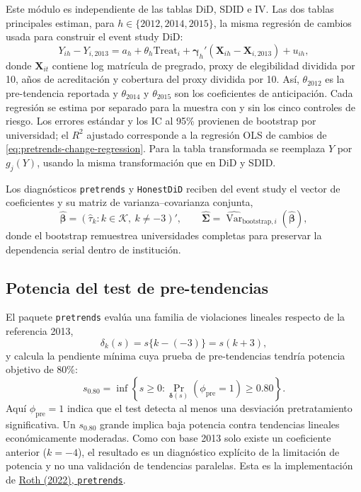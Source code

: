 \documentclass[11pt]{article}
\newcommand{\Treat}{\mathrm{Treat}}
\newcommand{\Var}{\operatorname{Var}}
\newcommand{\file}[1]{\texttt{#1}}
\begin{document}
Este módulo es independiente de las tablas DiD, SDID e IV. Las dos tablas
principales estiman, para $h\in\{2012,2014,2015\}$, la misma regresión de
cambios usada para construir el event study DiD:
\begin{equation}
 Y_{ih}-Y_{i,2013}
 =a_h+\theta_h\Treat_i
 +\boldsymbol\gamma_h'
   (\mathbf X_{ih}-\mathbf X_{i,2013})+u_{ih},
 \label{eq:pretrends-change-regression}
\end{equation}
donde $\mathbf X_{it}$ contiene log matrícula de pregrado, proxy de elegibilidad
dividida por 10, años de acreditación y cobertura del proxy dividida por 10.
Así, $\theta_{2012}$ es la pre-tendencia reportada y $\theta_{2014}$ y
$\theta_{2015}$ son los coeficientes de anticipación. Cada regresión se estima
por separado para la muestra con y sin los cinco controles de riesgo. Los
errores estándar y los IC al 95\% provienen de bootstrap por universidad; el
$R^2$ ajustado corresponde a la regresión OLS de cambios de
\eqref{eq:pretrends-change-regression}. Para la tabla transformada se reemplaza
$Y$ por $g_j(Y)$, usando la misma transformación que en DiD y SDID.

Los diagnósticos \file{pretrends} y \file{HonestDiD} reciben del event study el
vector de coeficientes y su matriz de varianza--covarianza conjunta,
\begin{equation}
 \widehat{\boldsymbol\beta}
 =\left(\widehat\tau_k:k\in\mathcal K,\ k\neq-3\right)',
 \qquad
 \widehat{\boldsymbol\Sigma}
 =\widehat{\Var}_{\mathrm{bootstrap},i}
   (\widehat{\boldsymbol\beta}),
 \label{eq:roth-inputs}
\end{equation}
donde el bootstrap remuestrea universidades completas para preservar la
dependencia serial dentro de institución.

\subsection{Potencia del test de pre-tendencias}

El paquete \file{pretrends} evalúa una familia de violaciones lineales respecto
de la referencia 2013,
\begin{equation}
 \delta_k(s)=s\{k-(-3)\}=s(k+3),
 \label{eq:linear-pretrend}
\end{equation}
y calcula la pendiente mínima cuya prueba de pre-tendencias tendría potencia
objetivo de 80\%:
\begin{equation}
 s_{0.80}
 =\inf\left\{s\geq0:
 \Pr_{\boldsymbol\delta(s)}\!\left(\phi_{\mathrm{pre}}=1\right)
 \geq0.80\right\}.
 \label{eq:pretrend-power}
\end{equation}
Aquí $\phi_{\mathrm{pre}}=1$ indica que el test detecta al menos una desviación
pretratamiento significativa. Un $s_{0.80}$ grande implica baja potencia contra
tendencias lineales económicamente moderadas. Como con base 2013 solo existe un
coeficiente anterior ($k=-4$), el resultado es un diagnóstico explícito de la
limitación de potencia y no una validación de tendencias paralelas. Esta es la
implementación de \href{https://github.com/jonathandroth/pretrends}{Roth
(2022), \file{pretrends}}.
\end{document}
